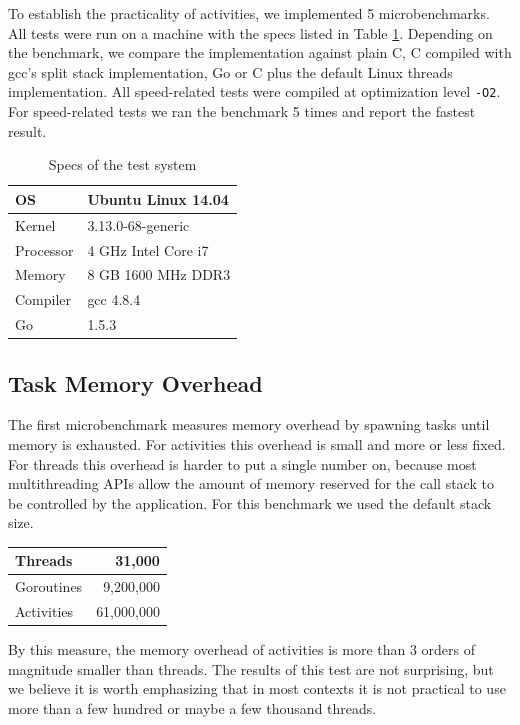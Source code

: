 \documentclass[9pt,preprint]{sigplanconf}
\begin{document}
To establish the practicality of activities, we implemented 5 microbenchmarks.
All tests were run on a machine with the specs listed in Table \ref{table:specs}.
Depending on the benchmark, we compare the \charcoal{} implementation against plain C, C compiled with gcc's split stack implementation, Go or C plus the default Linux threads implementation.
All speed-related tests were compiled at optimization level \texttt{-O2}.
For speed-related tests we ran the benchmark 5 times and report the fastest result.

\begin{table}
  \centering
  \begin{tabular}{|l|l|}
    \hline
    OS & Ubuntu Linux 14.04 \\
    \hline
    Kernel & 3.13.0-68-generic \\
    \hline
    Processor & 4 GHz Intel Core i7 \\
    \hline
    Memory & 8 GB 1600 MHz DDR3 \\
    \hline
    Compiler & gcc 4.8.4 \\
    \hline
    Go & 1.5.3 \\
    \hline
  \end{tabular}
  \caption{Specs of the test system}
  \label{table:specs}
\end{table}

\subsection{Task Memory Overhead}

The first microbenchmark measures memory overhead by spawning tasks until memory is exhausted.
For activities this overhead is small and more or less fixed.
For threads this overhead is harder to put a single number on, because most multithreading APIs allow the amount of memory reserved for the call stack to be controlled by the application.
For this benchmark we used the default stack size.

\vspace{1em}
\begin{tabular}{|l|r|}
  \hline
  Threads & 31,000 \\
  \hline
  Goroutines & 9,200,000 \\
  \hline
  Activities & 61,000,000 \\
  \hline
\end{tabular}
\vspace{1em}

By this measure, the memory overhead of activities is more than 3 orders of magnitude smaller than threads.
The results of this test are not surprising, but we believe it is worth emphasizing that in most contexts it is not practical to use more than a few hundred or maybe a few thousand threads.
\end{document}
